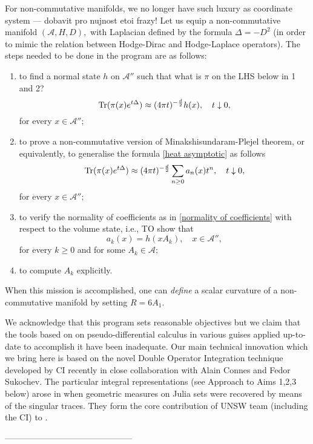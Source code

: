 \documentclass{article}
\begin{document}
For non-commutative manifolds, we no longer have such luxury as coordinate system {\color{red}--- dobavit pro nujnost etoi frazy!} Let us equip a non-commutative manifold $(\mathcal{A},H,D),$ with Laplacian defined by the formula $\Delta=-D^2$ (in order to mimic the relation between Hodge-Dirac and Hodge-Laplace operators). The steps needed to be done in the program are as follows:
\begin{enumerate}
\item\label{raph1} to find a normal state $h$ on $\mathcal{A}''$ such that {\color{red} what is $\pi$ on the LHS below in 1 and 2?}
\begin{equation}\label{raph1 eq}
{\rm Tr}(\pi(x)e^{t\Delta})\approx (4\pi t)^{-\frac{d}{2}} h(x),\quad t\downarrow0,
\end{equation}
for every $x\in\mathcal{A}'';$
\item\label{raph2} to prove a non-commutative version of Minakshisundaram-Plejel theorem, {\color{red} or equivalently, to} generalise the formula \eqref{heat asymptotic} as follows
$${\rm Tr}(\pi(x)e^{t\Delta})\approx (4\pi t)^{-\frac{d}{2}} \sum_{n\geq0}a_n(x)t^n,\quad t\downarrow0,$$
for every $x\in\mathcal{A}'';$
\item\label{raph3} to verify the normality of coefficients as in \eqref{normality of coefficients} with respect to the volume state, i.e., TO show that
$$a_k(x)=h(xA_k),\quad x\in\mathcal{A}'',$$
for every $k\geq0$ and for some $A_k\in\mathcal{A};$ 
\item\label{raph4} to compute $A_k$ explicitly.
\end{enumerate}
When this mission is accomplished, one can {\it define} a scalar curvature of a non-commutative manifold by setting $R=6A_1.$

We acknowledge that this program sets reasonable objectives but we claim that the tools based on on pseudo-differential calculus in various guises applied up-to-date to accomplish it have been inadequate. Our main technical innovation which we bring here  is based on the novel Double Operator Integration technique developed by CI recently in close collaboration with Alain Connes and Fedor Sukochev. The particular integral representations (see Approach to Aims 1,2,3 below) arose in \cite{Connes_team} when geometric measures on Julia sets were recovered by means of the singular traces. They form the core contribution of UNSW team (including the CI) to \cite{Connes_team}.



---------------------------------------------
\end{document}
